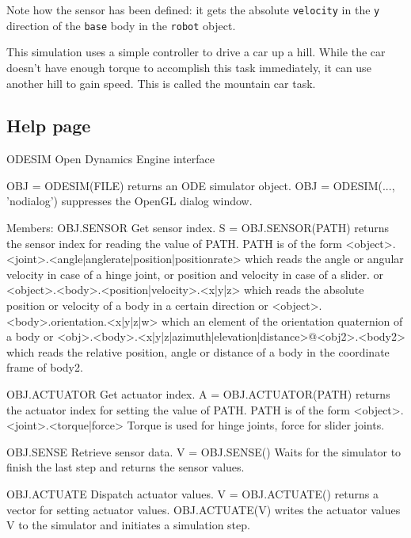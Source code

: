 \documentclass{article}
\newcommand{\txt}[1]{\texttt{#1}}
\newenvironment{code}{\alltt\small}{\endalltt}
\begin{document}
Note how the sensor has been defined: it gets the absolute \txt{velocity} in the \txt{y} direction of the \txt{base} body in the \txt{robot} object.

This simulation uses a simple controller to drive a car up a hill. While the car doesn't have enough torque to accomplish this task immediately, it can use another hill to gain speed. This is called the mountain car task.

\subsection{Help page}
\begin{code}
ODESIM Open Dynamics Engine interface

   OBJ = ODESIM(FILE) returns an ODE simulator object.
   OBJ = ODESIM(..., 'nodialog') suppresses the OpenGL dialog window.

   Members:
      OBJ.SENSOR Get sensor index.
         S = OBJ.SENSOR(PATH) returns the sensor index for reading the
         value of PATH. PATH is of the form
            <object>.<joint>.<angle|anglerate|position|positionrate>
            which reads the angle or angular velocity in case of a hinge
            joint, or position and velocity in case of a slider.
         or
            <object>.<body>.<position|velocity>.<x|y|z>
            which reads the absolute position or velocity of a body in
            a certain direction
         or
            <object>.<body>.orientation.<x|y|z|w>
            which an element of the orientation quaternion of a body
         or
            <obj>.<body>.<x|y|z|azimuth|elevation|distance>@<obj2>.<body2>
            which reads the relative position, angle or distance of a
            body in the coordinate frame of body2.

      OBJ.ACTUATOR Get actuator index.
         A = OBJ.ACTUATOR(PATH) returns the actuator index for setting the
         value of PATH. PATH is of the form
         <object>.<joint>.<torque|force>
         Torque is used for hinge joints, force for slider joints.

      OBJ.SENSE Retrieve sensor data.
         V = OBJ.SENSE() Waits for the simulator to finish the last
         step and returns the sensor values.

      OBJ.ACTUATE Dispatch actuator values.
         V = OBJ.ACTUATE() returns a vector for setting actuator values.
         OBJ.ACTUATE(V) writes the actuator values V to the simulator
         and initiates a simulation step.


\end{code}
\end{document}
